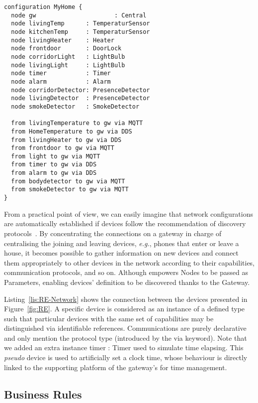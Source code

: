 \begin{lstlisting}[label=lis:RE-Network,language=iotdsl,caption=Network Configuration for Alice's House]	
configuration MyHome {
  node gw 					   : Central
  node livingTemp      : TemperaturSensor
  node kitchenTemp     : TemperaturSensor
  node livingHeater    : Heater
  node frontdoor       : DoorLock
  node corridorLight   : LightBulb
  node livingLight     : LightBulb
  node timer           : Timer
  node alarm           : Alarm
  node corridorDetector: PresenceDetector
  node livingDetector  : PresenceDetector
  node smokeDetector   : SmokeDetector

  from livingTemperature to gw via MQTT
  from HomeTemperature to gw via DDS
  from livingHeater to gw via DDS
  from frontdoor to gw via MQTT
  from light to gw via MQTT
  from timer to gw via DDS
  from alarm to gw via DDS
  from bodydetector to gw via MQTT
  from smokeDetector to gw via MQTT
}
\end{lstlisting}	

From a practical point of view, we can easily imagine that network configurations are automatically established if devices follow the recommendation of discovery protocols~\cite{J:AlFuqaha-etAl:2014}. By concentrating the connections on a gateway in charge of centralising the joining and leaving devices, \textit{e.g.}, phones that enter or leave a house, it becomes possible to gather information on new devices and connect them appropriately to other devices in the network according to their capabilities, communication protocols, and so on. Although \IOTDSL empowers \textsf{Node}s to be passed as \textsf{Parameter}s, enabling devices' definition to be discovered thanks to the \textsf{Gateway}.


Listing~\ref{lis:RE-Network} shows the connection between the devices presented in Figure~\ref{fig:RE}. A specific device is considered as an instance of a defined type such that particular devices with the same set of capabilities may be distinguished via identifiable references. Communications are purely declarative and only mention the protocol type (introduced by the \textsf{via} keyword). Note that we added an extra instance \textsf{timer : Timer} used to simulate time elapsing. This \textit{pseudo} device is used to artificially set a clock time, whose behaviour is directly linked to the supporting platform of the gateway's for time management.
	
\vspace{-0.3cm}
\subsection{Business Rules}
\label{sec:IoTDSL-BusinessRules}
\vspace{-0.3cm}

